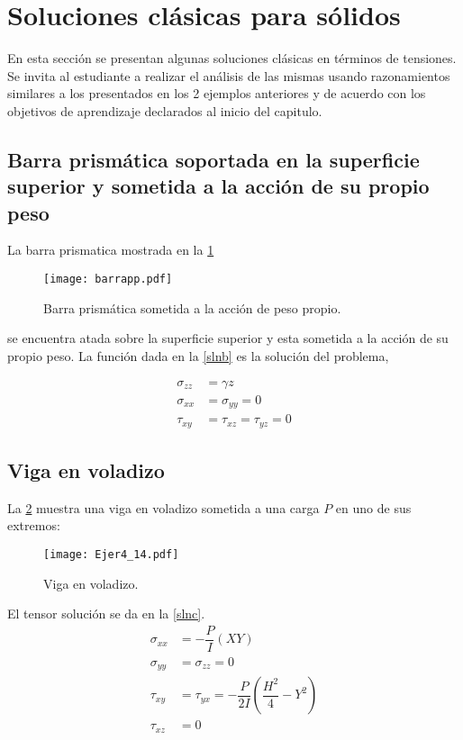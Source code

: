 \documentclass[../notas medios.tex]{subfiles}
\begin{document}
\section{Soluciones clásicas para sólidos}
En esta sección se presentan algunas soluciones clásicas en términos de tensiones. Se invita al estudiante a realizar el análisis de las mismas usando razonamientos similares a los presentados en los 2 ejemplos anteriores y de acuerdo con los objetivos de aprendizaje declarados al inicio del capitulo.

\subsection{Barra prismática soportada en la superficie superior y sometida a la acción de su propio peso}

La barra prismatica mostrada en la \cref{barra}
\begin{figure}[H]
\centering
	\texttt{[image: barrapp.pdf]}
	\caption{Barra prismática sometida a la acción de peso propio.}
	\label{barra}
\end{figure}

se encuentra atada sobre la superficie superior y esta sometida a la acción de su propio peso. La función dada en la \cref{slnb} es la solución del problema,


\begin{equation}
\begin{split}
{\sigma _{zz}} & = \gamma z \\
{\sigma _{xx}} & = {\sigma _{yy}} = 0 \\
{\tau _{xy}}   & = {\tau _{xz}} = {\tau _{yz}} = 0
\end{split}
\label{slnb}
\end{equation}


\subsection{Viga en voladizo}

La \cref{Viga} muestra una viga en voladizo sometida a una carga $P$ en uno de sus extremos: 
\begin{figure}[H]
\centering
	\texttt{[image: Ejer4\_14.pdf]}
	\caption{Viga en voladizo.}
	\label{Viga}
\end{figure}

El tensor solución se da en la \cref{slnc}.
\begin{equation}
\begin{split}
{\sigma_{xx}} & = - \dfrac{P}{I} (XY) \\
 {\sigma_{yy} }&= \sigma_{zz} = 0 \\
{\tau_{xy}} & = \tau_{yx} = - \dfrac{P}{2I} (\dfrac{H^2}{4} - Y^2) \\ 
{\tau_{xz}} &= 0
\end{split}	
\label{viga}
\end{equation}
\end{document}
